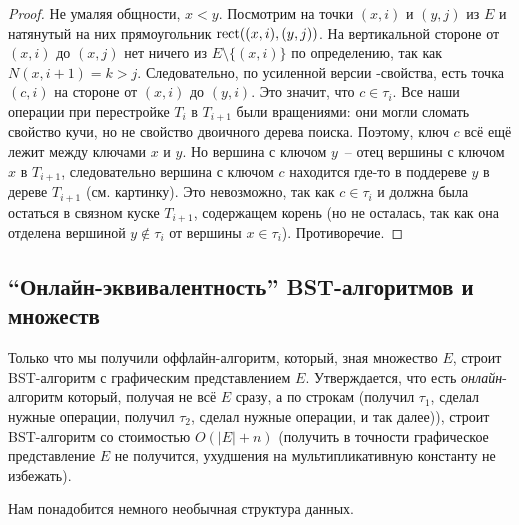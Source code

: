 \begin{proof}
Не умаляя общности, $x < y$. Посмотрим на точки $(x, i)$ и $(y, j)$ из $E$ и натянутый на них прямоугольник $\operatorname{rect}((x, i), (y, j))$. На вертикальной стороне от $(x, i)$ до $(x, j)$ нет ничего из $E \setminus \{(x, i) \}$ по определению, так как $N(x, i + 1) = k > j$. Следовательно, по усиленной версии \arbs-свойства, есть точка $(c, i)$ на
стороне от $(x, i)$ до $(y, i)$. Это значит, что $c \in \tau_i$. Все наши операции при перестройке $T_i$ в $T_{i+1}$ были вращениями: они могли сломать свойство кучи, но не свойство двоичного дерева поиска. Поэтому, ключ $c$ всё ещё лежит между ключами $x$ и $y$. Но вершина с ключом $y$~-- отец вершины с ключом $x$ в $T_{i+1}$, следовательно вершина с ключом $c$ находится где-то в поддереве $y$ в дереве $T_{i + 1}$ (см. картинку). Это невозможно, так как $c \in \tau_i$ и должна была остаться в связном куске $T_{i + 1}$, содержащем корень (но не осталась, так как она отделена вершиной $y \notin \tau_i$ от вершины $x \in \tau_i$). Противоречие.
\end{proof}

\subsection{``Онлайн-эквивалентность'' BST-алгоритмов и \arbs множеств}

Только что мы получили оффлайн-алгоритм, который, зная \arbs множество $E$, строит BST-алгоритм с графическим представлением $E$. Утверждается, что есть \emph{онлайн}-алгоритм который, получая не всё $E$ сразу, а по строкам (получил $\tau_1$, сделал нужные операции, получил $\tau_2$, сделал нужные операции, и так далее)), строит BST-алгоритм со стоимостью $O(|E| + n)$ 	
(получить в точности графическое представление $E$ не получится, ухудшения на мультипликативную константу не избежать).

Нам понадобится немного необычная структура данных.


